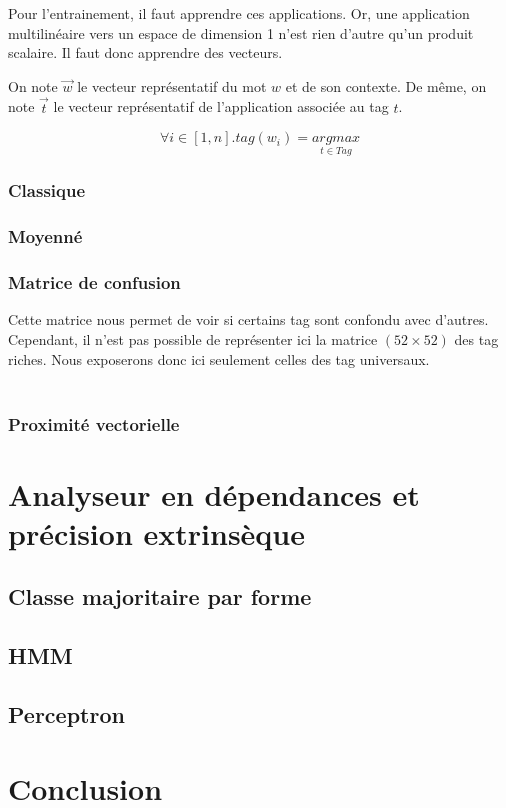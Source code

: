 \documentclass{article}
\begin{document}
Pour l'entrainement, il faut apprendre ces applications. Or, une application multilinéaire vers un espace de dimension 1 n'est rien d'autre qu'un produit scalaire. Il faut donc apprendre des vecteurs.

On note $\overrightarrow{w}$ le vecteur représentatif du mot $w$ et de son contexte. De même, on note $\overrightarrow{t}$ le vecteur représentatif de l'application associée au tag $t$.

$$\forall i \in [1,n] . tag(w_i) = \underset{t \in Tag}{argmax}$$

\subsubsection{Classique}

\subsubsection{Moyenné}

\subsubsection{Matrice de confusion}

Cette matrice nous permet de voir si certains tag sont confondu avec d'autres. Cependant, il n'est pas possible de représenter ici la matrice $(52 \times 52)$ des tag riches. Nous exposerons donc ici seulement celles des tag universaux.

$$
\begin{array}{l|c|c|c|c|c|c|c|c|c|c|c|c}

\end{array}
$$

\subsubsection{Proximité vectorielle}

\section{Analyseur en dépendances et précision extrinsèque}

\subsection{Classe majoritaire par forme}

\subsection{HMM}

\subsection{Perceptron}

\section{Conclusion}
\end{document}

